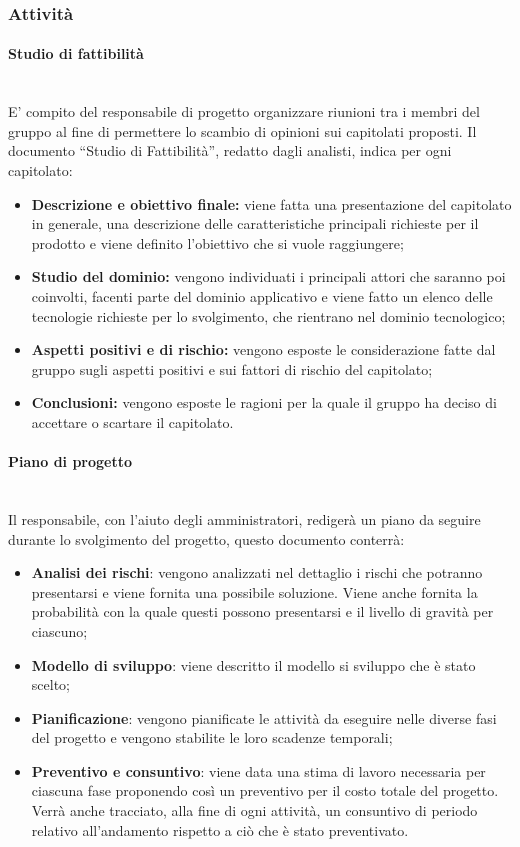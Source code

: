 \subsubsection{Attività}
\paragraph{Studio di fattibilità} \mbox{}\\ 
E' compito del responsabile di progetto organizzare riunioni tra i membri del gruppo al fine di permettere lo scambio di opinioni sui capitolati proposti.
Il documento ``Studio di Fattibilità'', redatto dagli analisti, indica per ogni capitolato:
\begin{itemize}
	\item \textbf{Descrizione e obiettivo finale:} viene fatta una presentazione del capitolato in generale, una descrizione delle caratteristiche principali richieste per il prodotto e viene definito l'obiettivo che si vuole raggiungere;
	\item \textbf{Studio del dominio:} vengono individuati i principali attori che saranno poi coinvolti, facenti parte del dominio applicativo e viene fatto un elenco delle tecnologie richieste per lo svolgimento, che rientrano nel dominio tecnologico;
	\item \textbf{Aspetti positivi e di rischio:} vengono esposte le considerazione fatte dal gruppo sugli aspetti positivi e sui fattori di rischio del capitolato;
	\item \textbf{Conclusioni:} vengono esposte le ragioni per la quale il gruppo ha deciso di accettare o scartare il capitolato.
\end{itemize}
\paragraph{Piano di progetto} \mbox{}\\
Il responsabile, con l'aiuto degli amministratori, redigerà un piano da seguire durante lo svolgimento del progetto, questo documento conterrà:
\begin{itemize}
	\item \textbf{Analisi dei rischi}: vengono analizzati nel dettaglio i rischi che potranno presentarsi e viene fornita una possibile soluzione. Viene anche fornita la probabilità con la quale questi possono presentarsi e il livello di gravità per ciascuno;
	\item \textbf{Modello di sviluppo}: viene descritto il modello si sviluppo che è stato scelto;
	\item \textbf{Pianificazione}: vengono pianificate le attività da eseguire nelle diverse fasi del progetto e vengono stabilite le loro scadenze temporali;
	\item \textbf{Preventivo e consuntivo}: viene data una stima di lavoro necessaria per ciascuna fase proponendo così un preventivo per il costo totale del progetto. Verrà anche tracciato, alla fine di ogni attività, un consuntivo di periodo relativo all'andamento rispetto a ciò che è stato preventivato.
\end{itemize}
